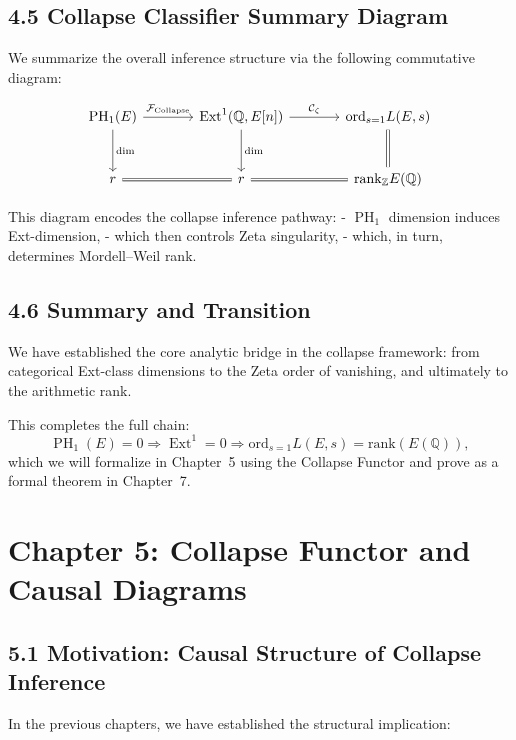 \documentclass[11pt]{article}
\DeclareMathOperator{\Ext}{Ext}
\DeclareMathOperator{\PH}{PH}
\newcommand{\QQ}{\mathbb{Q}}
\newcommand{\ZZ}{\mathbb{Z}}
\begin{document}
\subsection{4.5 Collapse Classifier Summary Diagram}

We summarize the overall inference structure via the following commutative diagram:

\[
\begin{tikzcd}[row sep=large, column sep=large]
\PH_1(E) \arrow[r, "\mathcal{F}_{\mathrm{Collapse}}"] \arrow[d, "\dim"]
& \Ext^1(\QQ,E[n]) \arrow[d, "\dim"] \arrow[r, "\mathcal{C}_{\zeta}"]
& \mathrm{ord}_{s=1} L(E,s) \arrow[d, equal] \\
r \arrow[r, equal] & r \arrow[r, equal] & \mathrm{rank}_{\ZZ} E(\QQ)
\end{tikzcd}
\]

This diagram encodes the collapse inference pathway:
- $\PH_1$ dimension induces Ext-dimension,
- which then controls Zeta singularity,
- which, in turn, determines Mordell–Weil rank.

\subsection{4.6 Summary and Transition}

We have established the core analytic bridge in the collapse framework:  
from categorical Ext-class dimensions to the Zeta order of vanishing, and ultimately to the arithmetic rank.

This completes the full chain:
\[
\PH_1(E) = 0 \Rightarrow \Ext^1 = 0 \Rightarrow \mathrm{ord}_{s=1} L(E,s) = \mathrm{rank}(E(\QQ)),
\]
which we will formalize in Chapter~5 using the Collapse Functor and prove as a formal theorem in Chapter~7.




\section{Chapter 5: Collapse Functor and Causal Diagrams}

\subsection{5.1 Motivation: Causal Structure of Collapse Inference}

In the previous chapters, we have established the structural implication:
\end{document}

